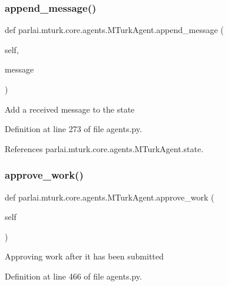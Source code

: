 \subsubsection{\texorpdfstring{append\+\_\+message()}{append\_message()}}
{\footnotesize\ttfamily def parlai.\+mturk.\+core.\+agents.\+M\+Turk\+Agent.\+append\+\_\+message (\begin{DoxyParamCaption}\item[{}]{self,  }\item[{}]{message }\end{DoxyParamCaption})}

\begin{DoxyVerb}Add a received message to the state\end{DoxyVerb}
 

Definition at line 273 of file agents.\+py.



References parlai.\+mturk.\+core.\+agents.\+M\+Turk\+Agent.\+state.

\mbox{\label{classparlai_1_1mturk_1_1core_1_1agents_1_1MTurkAgent_a5dad7b198d999ce61833a8b255b5f6d3}} 
\subsubsection{\texorpdfstring{approve\+\_\+work()}{approve\_work()}}
{\footnotesize\ttfamily def parlai.\+mturk.\+core.\+agents.\+M\+Turk\+Agent.\+approve\+\_\+work (\begin{DoxyParamCaption}\item[{}]{self }\end{DoxyParamCaption})}

\begin{DoxyVerb}Approving work after it has been submitted\end{DoxyVerb}
 

Definition at line 466 of file agents.\+py.




